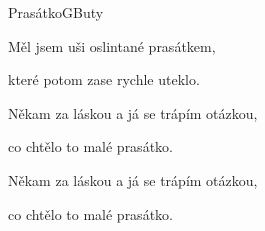 \begin{song}{Prasátko}{G}{Buty}

\Ch{$|$:}{}     \Ch{:$|$}{}
\begin{SBVerse}




\end{SBVerse}

\begin{SBVerse}

Měl jsem uši oslintané prasátkem,

které potom zase rychle uteklo.

Někam za láskou a já se trápím otázkou,

co chtělo to malé prasátko.

Někam za láskou a já se trápím otázkou,

co chtělo to malé prasátko.

\end{SBVerse}

\end{song}

\pagebreak